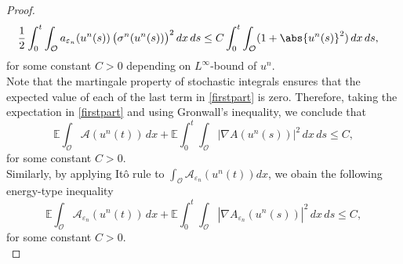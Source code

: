 \documentclass[10pt,number,preprint,times]{elsarticle}
\numberwithin{equation}{section} %
\begin{document}
\begin{proof}
{\begin{equation}
\begin{split}
&\frac{1}{2}\int_0^t\int_{\mathcal{O}} a_{\varepsilon_n}(u^n(s))\,\big(\sigma^n(u^n(s))\big)^2 \,dx\,ds
\leq C \int_0^t\int_{\mathcal{O}} (1+\abs{u^n(s)}^2)\,dx\,ds,
	\end{split}
\end{equation}
for some constant $C>0$ depending on $L^\infty$-bound of $u^n$.\\
\noindent Note that the martingale property of stochastic integrals
ensures that the expected value of each of the last term in \eqref{firstpart} is zero. Therefore, 
taking the expectation in \eqref{firstpart} and using Gronwall’s inequality, we conclude that
$$
\mathbb{E} \int_{\mathcal{O}}\mathcal{A}(u^n(t))\,dx
+ \mathbb{E} \int_0^t\int_{\mathcal{O}} |\nabla A(u^n(s))|^2 \,dx\,ds \leq C,
$$
for some constant $C>0$. \\
\noindent Similarly, by applying Itô rule to $ \displaystyle \int_{\mathcal{O}}\mathcal{A}_{\varepsilon_n}(u^n(t))dx$, we obain the following energy-type inequality
$$
\mathbb{E} \int_{\mathcal{O}}\mathcal{A}_{\varepsilon_n}(u^n(t))\,dx
+ \mathbb{E} \int_0^t\int_{\mathcal{O}} |\nabla A_{\varepsilon_n}(u^n(s))|^2 \,dx\,ds \leq C,
$$
for some constant $C>0$. \\

}
\end{proof}
\end{document}
